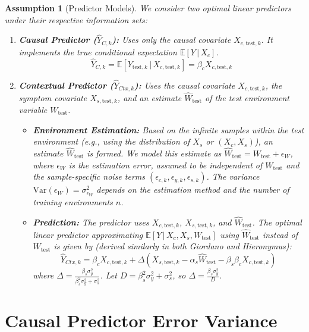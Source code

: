 \documentclass[11pt]{article}
\newtheorem{assumption}{Assumption}[section]
\newcommand{\E}{\mathbb{E}}
\newcommand{\Var}{\mathrm{Var}}
\newcommand{\given}{\,|\,}
\begin{document}
\begin{assumption}[Predictor Models]
We consider two optimal linear predictors under their respective information sets:
\begin{enumerate}
    \item \textbf{Causal Predictor ($\hat{Y}_{C,k}$):} Uses only the causal covariate $X_{c,\text{test},k}$. It implements the true conditional expectation $\E[Y \given X_c]$.
    \[ \hat{Y}_{C,k} = \E[Y_{\text{test},k} \given X_{c,\text{test},k}] = \beta_c X_{c,\text{test},k} \]
    \item \textbf{Contextual Predictor ($\hat{Y}_{Ctx,k}$):} Uses the causal covariate $X_{c,\text{test},k}$, the symptom covariate $X_{s,\text{test},k}$, and an estimate $\hat{W}_{\text{test}}$ of the test environment variable $W_{\text{test}}$.
        \begin{itemize}
            \item \textbf{Environment Estimation:} Based on the infinite samples within the test environment (e.g., using the distribution of $X_s$ or $(X_c, X_s)$), an estimate $\hat{W}_{\text{test}}$ is formed. We model this estimate as $\hat{W}_{\text{test}} = W_{\text{test}} + \epsilon_W$, where $\epsilon_W$ is the estimation error, assumed to be independent of $W_{\text{test}}$ and the sample-specific noise terms $(\epsilon_{c,k}, \epsilon_{y,k}, \epsilon_{s,k})$. The variance $\Var(\epsilon_W) = \sigma_{\epsilon_W}^2$ depends on the estimation method and the number of training environments $n$.
            \item \textbf{Prediction:} The predictor uses $X_{c,\text{test},k}$, $X_{s,\text{test},k}$, and $\hat{W}_{\text{test}}$. The optimal linear predictor approximating $\E[Y \given X_c, X_s, W_{\text{test}}]$ using $\hat{W}_{\text{test}}$ instead of $W_{\text{test}}$ is given by (derived similarly in both Giordano and Hieronymus):
            \[ \hat{Y}_{Ctx,k} = \beta_c X_{c,\text{test},k} + \Delta (X_{s,\text{test},k} - \alpha_s \hat{W}_{\text{test}} - \beta_s \beta_c X_{c,\text{test},k}) \]
            where $\Delta = \frac{\beta_s \sigma_y^2}{\beta_s^2 \sigma_y^2 + \sigma_s^2}$. Let $D = \beta_s^2 \sigma_y^2 + \sigma_s^2$, so $\Delta = \frac{\beta_s \sigma_y^2}{D}$.
        \end{itemize}
\end{enumerate}
\end{assumption}

\section{Causal Predictor Error Variance}
\end{document}
